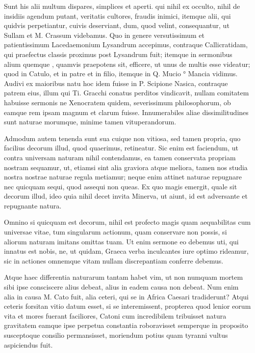  Sunt his alii multum dispares, simplices et aperti. qui nihil ex occulto, nihil de insidiis agendum putant, veritatis cultores, fraudis inimici, itemque alii, qui quidvis perpetiantur, cuivis deserviant, dum, quod velint, consequantur, ut Sullam et M. Crassum videbamus. Quo in genere versutissimum et patientissimum Lacedaemonium Lysandrum accepimus, contraque Callicratidam, qui praefectus classis proximus post Lysandrum fuit; itemque in sermonibus alium quemque , quamvis praepotens sit, efficere, ut unus de multis esse videatur; quod in Catulo, et in patre et in filio, itemque in Q. Mucio ° Mancia vidimus. Audivi ex maioribus natu hoc idem fuisse in P. Scipione Nasica, contraque patrem eius, illum qui Ti. Gracchi conatus perditos vindicavit, nullam comitatem habuisse sermonis ne Xenocratem quidem, severissimum philosophorum, ob eamque rem ipsam magnum et clarum fuisse. Innumerabiles aliae dissimilitudines sunt naturae morumque, minime tamen vituperandorum.

 Admodum autem tenenda sunt sua cuique non vitiosa, sed tamen propria, quo facilius decorum illud, quod quaerimus, retineatur. Sic enim est faciendum, ut contra universam naturam nihil contendamus, ea tamen conservata propriam nostram sequamur, ut, etiamsi sint alia graviora atque meliora, tamen nos studia nostra nostrae naturae regula metiamur; neque enim attinet naturae repugnare nec quicquam sequi, quod assequi non queas. Ex quo magis emergit, quale sit decorum illud, ideo quia nihil decet invita Minerva, ut aiunt, id est adversante et repugnante natura.

 Omnino si quicquam est decorum, nihil est profecto magis quam aequabilitas cum universae vitae, tum singularum actionum, quam conservare non possis, si aliorum naturam imitans omittas tuam. Ut enim sermone eo debemus uti, qui innatus est nobis, ne, ut quidam, Graeca verba inculcantes iure optimo rideamur, sic in actiones omnemque vitam nullam discrepantiam conferre debemus.

 Atque haec differentia naturarum tantam habet vim, ut non numquam mortem sibi ipse consciscere alius debeat, alius in eadem causa non debeat. Num enim alia in causa M. Cato fuit, alia ceteri, qui se in Africa Caesari tradiderunt? Atqui ceteris forsitan vitio datum esset, si se interemissent, propterea quod lenior eorum vita et mores fuerant faciliores, Catoni cum incredibilem tribuisset natura gravitatem eamque ipse perpetua constantia roboravisset semperque in proposito susceptoque consilio permansisset, moriendum potius quam tyranni vultus aspiciendus fuit.

